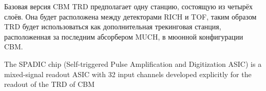 
Базовая версия CBM TRD предполагает одну станцию, состоящую из четырёх слоёв.
Она будет расположена между детекторами RICH и TOF, таким образом \todo
TRD будет использоваться как дополнительная трекинговая станция, расположенная за последним абсорбером MUCH, в мюонной конфигурации CBM.


The SPADIC chip (Self-triggered Pulse Amplification and Digitization ASIC) is a mixed-signal readout ASIC with 32 input channels developed explicitly for the readout of the TRD of CBM

